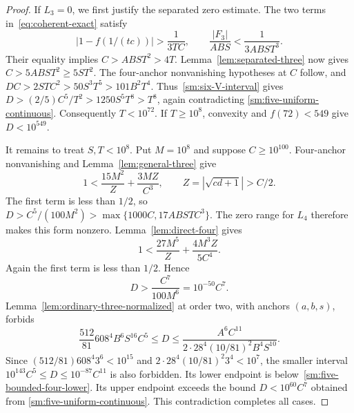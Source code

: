 \documentclass[12pt]{article}
\numberwithin{equation}{section}
\begin{document}
\begin{proof}
If $L_3=0$, we first justify the separated zero estimate.
The two terms in~\eqref{eq:coherent-exact} satisfy
\[
 |1-f(1/(tc))|>\frac1{3TC},\qquad
 \frac{|F_3|}{ABS}<\frac1{3ABS T^3}.
\]
Their equality implies $C>ABS T^2>4T$.
Lemma~\ref{lem:separated-three} now gives
$C>5ABS T^2\ge5ST^2$. The four-anchor nonvanishing hypotheses
at $C$ follow, and
$DC>2STC^2>50S^3T^5>101B^2T^4$.
Thus~\eqref{sm:six-V-interval} gives
$D>(2/5)C^5/T^2>1250S^5T^8>T^8$, again contradicting
\eqref{sm:five-uniform-continuous}. Consequently $T<10^{72}$.
If $T\ge10^8$, convexity and $f(72)<549$ give $D<10^{549}$.

It remains to treat $S,T<10^8$. Put $M=10^8$ and suppose
$C\ge10^{100}$. Four-anchor nonvanishing and
Lemma~\ref{lem:general-three} give
\[
 1<\frac{15M^2}{Z}+\frac{3MZ}{C^3},\qquad
 Z=|\sqrt{cd+1}|>C/2.
\]
The first term is less than $1/2$, so
$D>C^5/(100M^2)>\max\{1000C,17ABSTC^3\}$.
The zero range for $L_4$ therefore makes this form nonzero.
Lemma~\ref{lem:direct-four} gives
\[
 1<\frac{27M^5}{Z}+\frac{4M^3Z}{5C^4}.
\]
Again the first term is less than $1/2$. Hence
\begin{equation}\label{sm:five-bounded-four-lower}
 D>\frac{C^7}{100M^6}=10^{-50}C^7.
\end{equation}
Lemma~\ref{lem:ordinary-three-normalized} at order two, with anchors
$(a,b,s)$, forbids
\[
 \frac{512}{81}608^4B^6S^{16}C^5\le D
 \le\frac{A^6C^{11}}{2\cdot28^4(10/81)^2B^4S^{10}}.
\]
Since $(512/81)608^4 3^6<10^{15}$ and
$2\cdot28^4(10/81)^2 3^4<10^7$, the smaller interval
$10^{143}C^5\le D\le10^{-87}C^{11}$ is also forbidden.
Its lower endpoint is below~\eqref{sm:five-bounded-four-lower}.
Its upper endpoint exceeds the bound $D<10^{60}C^7$ obtained from
\eqref{sm:five-uniform-continuous}. This contradiction completes all cases.
\end{proof}
\end{document}
